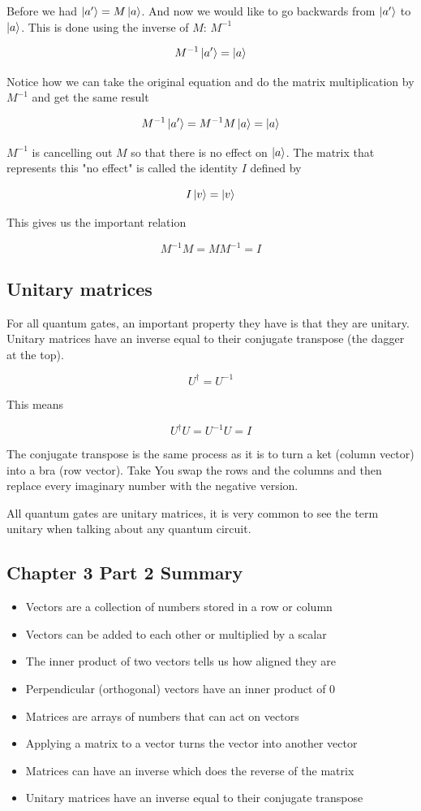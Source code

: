 \documentclass{book}
\begin{document}
Before we had $\ket{a'} = M\ket{a}$. And now we would like to go backwards from $\ket{a'}$ to $\ket{a}$. This is done using the inverse of $M$: $M^{-1}$

$$
 M^{-1}\ket{a'} = \ket{a} 
$$

Notice how we can take the original equation and do the matrix multiplication by $M^{-1}$ and get the same result

$$
M^{-1}\ket{a'} = M^{-1}M\ket{a} = \ket{a}
$$

$M^{-1}$ is cancelling out $M$ so that there is no effect on $\ket{a}$. The matrix that represents this "no effect" is called the identity $I$ defined by 


$$ I\ket{v} = \ket{v}$$

This gives us the important relation 


$$ M^{-1}M = MM^{-1} = I $$

\subsection{ Unitary matrices} 

For all quantum gates, an important property they have is that they are unitary. Unitary matrices have an inverse equal to their conjugate transpose (the dagger at the top).

$$ U^\dagger = U^{-1} $$

This means 

$$ U^\dagger U = U^{-1}U = I $$

The conjugate transpose is the same process as it is to turn a ket (column vector) into a bra (row vector). Take You swap the rows and the columns and then replace every imaginary number with the negative version. 

All quantum gates are unitary matrices, it is very common to see the term unitary when talking about any quantum circuit. 


\subsection{Chapter 3 Part 2 Summary }
\begin{itemize} 
    \item Vectors are a collection of numbers stored in a row or column
    \item Vectors can be added to each other or multiplied by a scalar
    \item The inner product of two vectors tells us how aligned they are
    \item  Perpendicular (orthogonal) vectors have an inner product of 0
    \item  Matrices are arrays of numbers that can act on vectors 
    \item  Applying a matrix to a vector turns the vector into another vector
    \item  Matrices can have an inverse which does the reverse of the matrix 
    \item  Unitary matrices have an inverse equal to their conjugate transpose
\end{itemize}
\end{document}
